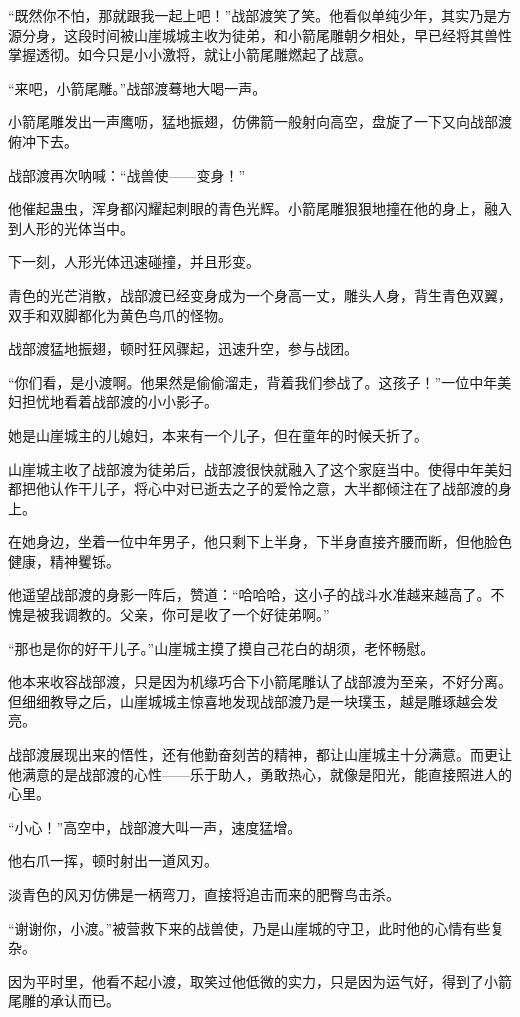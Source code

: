 \begin{this_body}
“既然你不怕，那就跟我一起上吧！”战部渡笑了笑。他看似单纯少年，其实乃是方源分身，这段时间被山崖城城主收为徒弟，和小箭尾雕朝夕相处，早已经将其兽性掌握透彻。如今只是小小激将，就让小箭尾雕燃起了战意。

“来吧，小箭尾雕。”战部渡蓦地大喝一声。

小箭尾雕发出一声鹰呖，猛地振翅，仿佛箭一般射向高空，盘旋了一下又向战部渡俯冲下去。

战部渡再次呐喊：“战兽使——变身！”

他催起蛊虫，浑身都闪耀起刺眼的青色光辉。小箭尾雕狠狠地撞在他的身上，融入到人形的光体当中。

下一刻，人形光体迅速碰撞，并且形变。

青色的光芒消散，战部渡已经变身成为一个身高一丈，雕头人身，背生青色双翼，双手和双脚都化为黄色鸟爪的怪物。

战部渡猛地振翅，顿时狂风骤起，迅速升空，参与战团。

“你们看，是小渡啊。他果然是偷偷溜走，背着我们参战了。这孩子！”一位中年美妇担忧地看着战部渡的小小影子。

她是山崖城主的儿媳妇，本来有一个儿子，但在童年的时候夭折了。

山崖城主收了战部渡为徒弟后，战部渡很快就融入了这个家庭当中。使得中年美妇都把他认作干儿子，将心中对已逝去之子的爱怜之意，大半都倾注在了战部渡的身上。

在她身边，坐着一位中年男子，他只剩下上半身，下半身直接齐腰而断，但他脸色健康，精神矍铄。

他遥望战部渡的身影一阵后，赞道：“哈哈哈，这小子的战斗水准越来越高了。不愧是被我调教的。父亲，你可是收了一个好徒弟啊。”

“那也是你的好干儿子。”山崖城主摸了摸自己花白的胡须，老怀畅慰。

他本来收容战部渡，只是因为机缘巧合下小箭尾雕认了战部渡为至亲，不好分离。但细细教导之后，山崖城城主惊喜地发现战部渡乃是一块璞玉，越是雕琢越会发亮。

战部渡展现出来的悟性，还有他勤奋刻苦的精神，都让山崖城主十分满意。而更让他满意的是战部渡的心性——乐于助人，勇敢热心，就像是阳光，能直接照进人的心里。

“小心！”高空中，战部渡大叫一声，速度猛增。

他右爪一挥，顿时射出一道风刃。

淡青色的风刃仿佛是一柄弯刀，直接将追击而来的肥臀鸟击杀。

“谢谢你，小渡。”被营救下来的战兽使，乃是山崖城的守卫，此时他的心情有些复杂。

因为平时里，他看不起小渡，取笑过他低微的实力，只是因为运气好，得到了小箭尾雕的承认而已。


\end{this_body}
